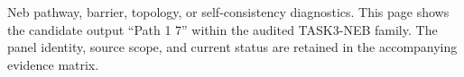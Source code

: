 Neb pathway, barrier, topology, or self-consistency diagnostics. This page shows the candidate output ``Path 1 7'' within the audited TASK3-NEB family. The panel identity, source scope, and current status are retained in the accompanying evidence matrix.
